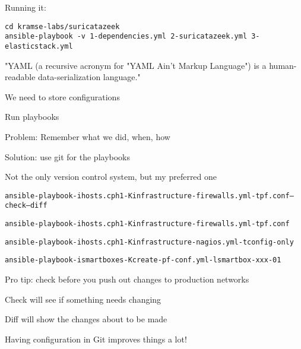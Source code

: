 \documentclass[Screen16to9,17pt]{foils}
\begin{document}
Running it:
\begin{verbatim}
cd kramse-labs/suricatazeek
ansible-playbook -v 1-dependencies.yml 2-suricatazeek.yml 3-elasticstack.yml
\end{verbatim}

"YAML (a recursive acronym for "YAML Ain't Markup Language") is a human-readable data-serialization language."\\





\begin{list2}
\item We need to store configurations
\item Run playbooks
\item Problem: Remember what we did, when, how
\item Solution: use git for the playbooks
\item Not the only version control system, but my preferred one
\end{list2}



\begin{alltt}\footnotesize
ansible-playbook -i hosts.cph1 -K infrastructure-firewalls.yml -t pf.conf --check --diff

ansible-playbook -i hosts.cph1 -K infrastructure-firewalls.yml -t pf.conf

ansible-playbook -i hosts.cph1 -K infrastructure-nagios.yml -t config-only

ansible-playbook -i smartboxes -K create-pf-conf.yml -l smartbox-xxx-01
\end{alltt}

\begin{list2}
\item Pro tip: check before you push out changes to production networks \smiley
\item Check will see if something needs changing
\item Diff will show the changes about to be made
\item Having configuration in Git improves things a lot!
\end{list2}




\end{document}
